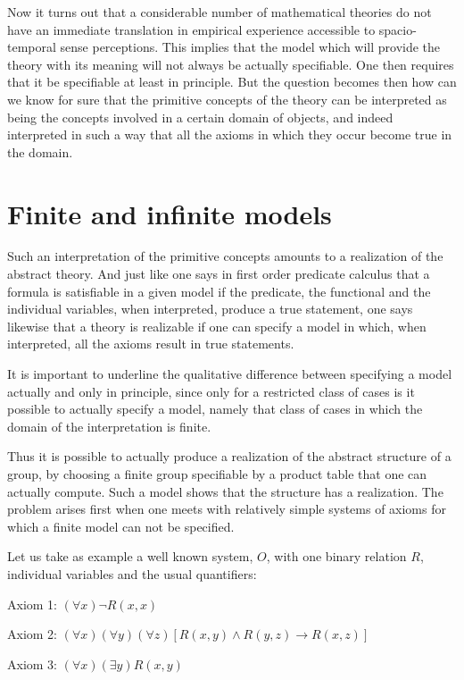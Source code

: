 \documentclass[12pt]{article}
\begin{document}
Now it turns out that a considerable number of mathematical theories do not have an immediate translation in empirical  experience  accessible to spacio-temporal  sense perceptions. This implies that the model which will provide the theory with its meaning will not  always be actually specifiable. One then requires that it be specifiable at least in principle. But the question becomes then how can we know for sure that the primitive concepts of the theory can be interpreted as being the concepts involved in a certain domain of objects, and indeed interpreted in such a way that all the axioms in which they occur become true in the domain.

\section{Finite and infinite models}\normalsize

Such an interpretation of the primitive concepts amounts to a realization of the abstract theory. And just like one says in first order predicate calculus that a formula is satisfiable in a given model if the predicate, the functional  and the individual variables, when interpreted, produce a true statement, one says likewise that a theory is realizable if one can specify a model in which, when interpreted, all the axioms result in true statements.

It is important to underline the qualitative difference between specifying a model actually and only in principle, since only for a restricted class of cases is it possible to actually specify a model, namely that  class of cases in which the domain of the interpretation is finite.

Thus it is possible to actually produce a realization of the abstract structure of a group, by choosing a finite group specifiable by a product table that one can actually compute. Such a model shows that the structure has a realization. The problem arises  first when one meets with relatively simple systems of axioms for which a finite model can not be specified.

Let us take as example a well known system, $O$, with one binary relation $R$, individual variables and the usual  quantifiers:

Axiom 1: $(\forall x) \neg R (x, x)$

Axiom 2: $(\forall x) (\forall y) (\forall z) [R (x, y) \wedge R (y, z) \rightarrow R (x, z)]$ 

Axiom 3: $(\forall x) (\exists y) R (x, y)$  
\end{document}
